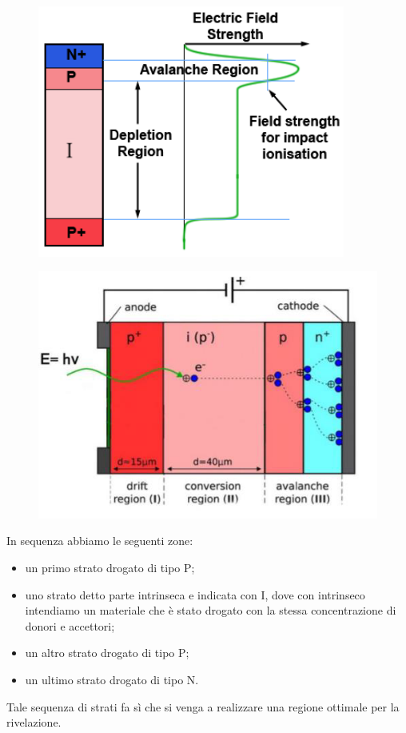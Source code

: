 \begin{minipage}{0.5\textwidth}
   \begin{figure}[H]
      \centering
      \includegraphics[width=0.9\textwidth]{immagini/APD_1.png}
   \end{figure}
\end{minipage}
\begin{minipage}{0.5\textwidth}
   \begin{figure}[H]
      \centering
      \includegraphics[width=\textwidth]{immagini/APD_2.png}
   \end{figure}
\end{minipage}

\vspace{0.2cm}In sequenza abbiamo le seguenti zone:
\begin{itemize}
   \item un primo strato drogato di tipo P;
   \item uno strato detto parte intrinseca e indicata con I, dove con intrinseco intendiamo un materiale che è stato drogato con la stessa concentrazione di donori e accettori;
   \item un altro strato drogato di tipo P;
   \item un ultimo strato drogato di tipo N.
\end{itemize}
Tale sequenza di strati fa sì che si venga a realizzare una regione ottimale per la rivelazione.

